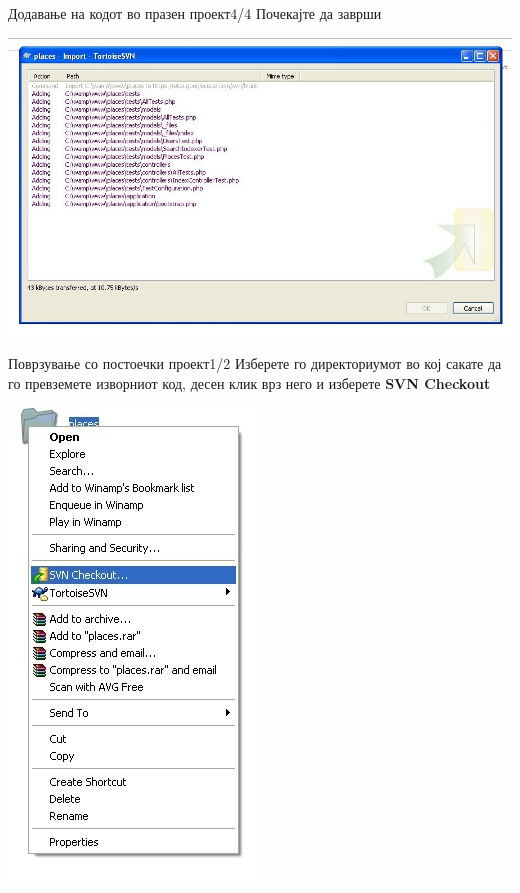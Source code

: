 \begin{frame}{Додавање на кодот во празен проект}{4/4}
Почекајте да заврши
\begin{center}
    \includegraphics[scale=0.2]{images/importing.png}
\end{center}
\end{frame}


\begin{frame}{Поврзување со постоечки проект}{1/2}
Изберете го директориумот во кој сакате да го
превземете изворниот код, десен клик врз него и
изберете \textbf{SVN Checkout}
\begin{center}
    \includegraphics[scale=0.4]{images/svn_checkout.png}
\end{center}
\end{frame}

